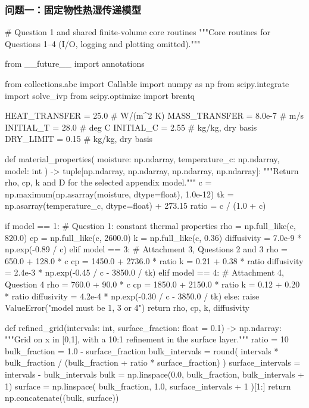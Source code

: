 \documentclass[withoutpreface,bwprint]{cumcmthesis}
\begin{document}
\subsubsection*{\centering 问题一：固定物性热湿传递模型}
\begin{PythonCode}
# Question 1 and shared finite-volume core routines
"""Core routines for Questions 1--4 (I/O, logging and plotting omitted)."""

from __future__ import annotations

from collections.abc import Callable
import numpy as np
from scipy.integrate import solve_ivp
from scipy.optimize import brentq


HEAT_TRANSFER = 25.0       # W/(m^2 K)
MASS_TRANSFER = 8.0e-7     # m/s
INITIAL_T = 28.0           # deg C
INITIAL_C = 2.55           # kg/kg, dry basis
DRY_LIMIT = 0.15           # kg/kg, dry basis


def material_properties(
    moisture: np.ndarray, temperature_c: np.ndarray, model: int
) -> tuple[np.ndarray, np.ndarray, np.ndarray, np.ndarray]:
    """Return rho, cp, k and D for the selected appendix model."""
    c = np.maximum(np.asarray(moisture, dtype=float), 1.0e-12)
    tk = np.asarray(temperature_c, dtype=float) + 273.15
    ratio = c / (1.0 + c)

    if model == 1:  # Question 1: constant thermal properties
        rho = np.full_like(c, 820.0)
        cp = np.full_like(c, 2600.0)
        k = np.full_like(c, 0.36)
        diffusivity = 7.0e-9 * np.exp(-0.89 / c)
    elif model == 3:  # Attachment 3, Questions 2 and 3
        rho = 650.0 + 128.0 * c
        cp = 1450.0 + 2736.0 * ratio
        k = 0.21 + 0.38 * ratio
        diffusivity = 2.4e-3 * np.exp(-0.45 / c - 3850.0 / tk)
    elif model == 4:  # Attachment 4, Question 4
        rho = 760.0 + 90.0 * c
        cp = 1850.0 + 2150.0 * ratio
        k = 0.12 + 0.20 * ratio
        diffusivity = 4.2e-4 * np.exp(-0.30 / c - 3850.0 / tk)
    else:
        raise ValueError("model must be 1, 3 or 4")
    return rho, cp, k, diffusivity


def refined_grid(intervals: int, surface_fraction: float = 0.1) -> np.ndarray:
    """Grid on x in [0,1], with a 10:1 refinement in the surface layer."""
    ratio = 10
    bulk_fraction = 1.0 - surface_fraction
    bulk_intervals = round(
        intervals * bulk_fraction / (bulk_fraction + ratio * surface_fraction)
    )
    surface_intervals = intervals - bulk_intervals
    bulk = np.linspace(0.0, bulk_fraction, bulk_intervals + 1)
    surface = np.linspace(
        bulk_fraction, 1.0, surface_intervals + 1
    )[1:]
    return np.concatenate((bulk, surface))



\end{PythonCode}
\end{document}
